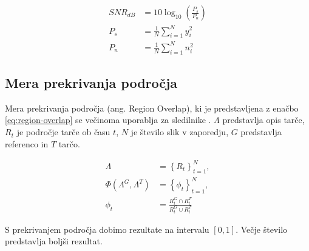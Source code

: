 \begin{subequations}
\begin{align}
SNR_{dB} &= 10 \log_{10}\left(\frac{P_s}{P_n}\right) \\
P_s &= \frac{1}{N} \sum_{i=1}^{N} y_i^2 \\
P_n &= \frac{1}{N} \sum_{i=1}^{N} n_i^2
\end{align}
\label{eq:snr}
\end{subequations}



\subsection{Mera prekrivanja področja}
Mera prekrivanja področja (ang. Region Overlap), ki je predstavljena z enačbo \ref{eq:region-overlap} se večinoma uporablja za sledilnike \cite{vcehovin2016visual}. $\Lambda$ predstavlja opis tarče, $R_t$ je področje tarče ob času $t$, $N$ je število slik v zaporedju, $G$ predstavlja referenco in $T$ tarčo.

\begin{subequations}
\begin{align}
	\Lambda &= \left\{R_t\right\}^N_{t=1}, \nonumber \\
	\Phi(\Lambda^G, \Lambda^T) &= \left\{\phi_t\right\}^N_{t=1}, \nonumber \\
    \phi_t &= \frac{R_t^G \cap R_t^T }{R_t^G \cup R_t^T} 
\end{align}
\label{eq:region-overlap}
\end{subequations}


S prekrivanjem področja dobimo rezultate na intervalu $\left[0,1\right]$. Večje število predstavlja boljši rezultat.



